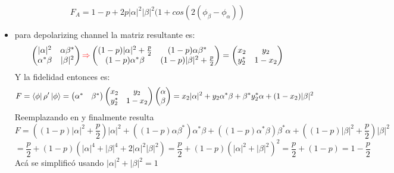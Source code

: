 \documentclass{book}
\begin{document}
\begin{itemize}
$$F_A= 1-p+2p\lvert\alpha\rvert^2\lvert\beta\rvert^2(1+cos(2(\phi_\beta-\phi_\alpha))$$
\item para depolarizing channel la matriz resultante es:
$$ \begin{pmatrix} \lvert\alpha\rvert^2 & \alpha\beta^* \\ \alpha^*\beta& \lvert\beta\rvert^2 \end{pmatrix} \textcolor{red}{\Rightarrow} \begin{pmatrix} (1-p)\lvert\alpha\rvert^2+\frac{p}{2} & (1-p)\alpha\beta^* \\ (1-p)\alpha^*\beta & (1-p)\lvert\beta\rvert^2+\frac{p}{2} \end{pmatrix} =\begin{pmatrix} x_2 & y_2 \\ y_2^* &1-x_2 \end{pmatrix}$$
Y la fidelidad entonces es:
$$F=\bra{\phi}\rho^\prime\ket{\phi}=\begin{pmatrix}\alpha^*&\beta^*\end{pmatrix}\begin{pmatrix} x_2 & y_2 \\ y_2^* &1-x_2 \end{pmatrix}\begin{pmatrix}\alpha\\ \beta\end{pmatrix}=x_2\lvert\alpha\rvert^2+y_2\alpha^*\beta+\beta^*y_2^*\alpha+(1-x_2)\lvert\beta\rvert^2$$
Reemplazando en y finalmente resulta
$$ F=((1-p)\lvert\alpha\rvert^2+\frac{p}{2})\lvert\alpha\rvert^2+((1-p)\alpha\beta^*)\alpha^*\beta+((1-p)\alpha^*\beta)\beta^*\alpha+((1-p)\lvert\beta\rvert^2+\frac{p}{2})\lvert\beta\rvert^2$$
$$=\frac{p}{2}+(1-p)(\lvert\alpha\rvert^4+\lvert\beta\rvert^4+2\lvert\alpha\rvert^2\lvert\beta\rvert^2)=\frac{p}{2}+(1-p)(\lvert\alpha\rvert^2+\lvert\beta\rvert^2)^2=\frac{p}{2}+(1-p)=1-\frac{p}{2}$$
Acá se simplificó usando $\lvert\alpha\rvert^2+\lvert\beta\rvert^2=1$
\end{itemize}
\end{document}
